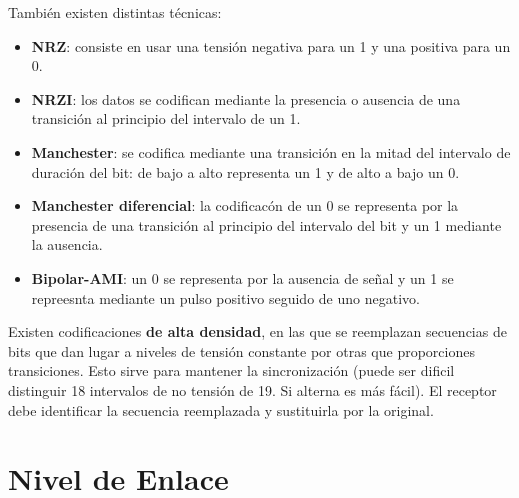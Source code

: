 \documentclass[]{article}
\begin{document}

También existen distintas técnicas:
\begin{itemize}
    \item \textbf{NRZ}: consiste en usar una tensión negativa para un 1 y una positiva para un 0.
    \item \textbf{NRZI}: los datos se codifican mediante la presencia o ausencia de una transición al principio del intervalo de un 1.
    \item \textbf{Manchester}: se codifica mediante una transición en la mitad del intervalo de duración del bit: de bajo a alto representa un 1 y de alto a bajo un 0.
    \item \textbf{Manchester diferencial}: la codificacón de un 0 se representa por la presencia de una transición al principio del intervalo del bit y un 1 mediante la ausencia.
    \item \textbf{Bipolar-AMI}: un 0 se representa por la ausencia de señal y un 1 se repreesnta mediante un pulso positivo seguido de uno negativo.
\end{itemize}

Existen codificaciones \textbf{de alta densidad}, en las que se reemplazan secuencias de bits que dan lugar a niveles de tensión constante por otras que proporciones transiciones. Esto sirve para mantener la sincronización (puede ser dificil distinguir 18 intervalos de no tensión de 19. Si alterna es más fácil). El receptor debe identificar la secuencia reemplazada y sustituirla por la original.





\section{Nivel de Enlace}
\end{document}
